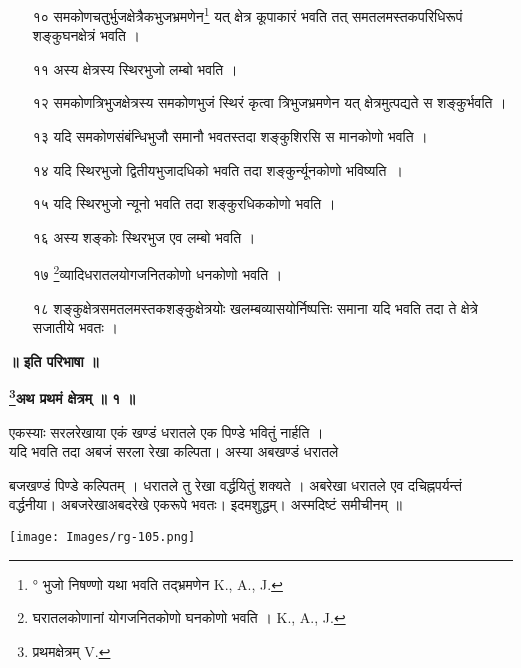 \documentclass[11pt, openany]{book}
\begin{document}
\begin{enumerate}
\item[१०] समकोणचतुर्भुजक्षेत्रैकभुजभ्रमणेन\renewcommand{\thefootnote}{१}\footnote{° भुजो निषण्णो यथा भवति तद्भ्रमणेन {\en K., A., J.}} यत् क्षेत्र कूपाकारं भवति तत् समतलमस्तकपरिधिरूपं शङ्कुघनक्षेत्रं भवति ।

\item[११] अस्य क्षेत्रस्य स्थिरभुजो लम्बो भवति ।

\item[१२] समकोणत्रिभुजक्षेत्रस्य समकोणभुजं स्थिरं कृत्वा त्रिभुजभ्रमणेन
 यत् क्षेत्रमुत्पद्यते स शङ्कुर्भवति ।

\item[१३] यदि समकोणसंबंन्धिभुजौ समानौ भवतस्तदा शङ्कुशिरसि स
 मानकोणो भवति ।

\item[१४] यदि स्थिरभुजो द्वितीयभुजादधिको भवति तदा शङ्कुर्न्यूनकोणो भविष्यति~।

\item[१५] यदि स्थिरभुजो न्यूनो भवति तदा शङ्कुरधिककोणो भवति ।

\item[१६] अस्य शङ्कोः स्थिरभुज एव लम्बो भवति ।

\item[१७] \renewcommand{\thefootnote}{२}\footnote{घरातलकोणानां योगजनितकोणो घनकोणो भवति । {\en K., A., J.}}व्यादिधरातलयोगजनितकोणो धनकोणो भवति ।

\item[१८] शङ्कुक्षेत्रसमतलमस्तकशङ्कुक्षेत्रयोः खलम्बव्यासयोर्निष्पत्तिः समाना
 यदि भवति तदा ते क्षेत्रे सजातीये भवतः ।
\end{enumerate}

\begin{center}
\textbf{ ॥ इति परिभाषा ॥}
\end{center}
\vspace{2mm}

\begin{center}
\textbf{\large  \renewcommand{\thefootnote}{३}\footnote{प्रथमक्षेत्रम् {\en V.}}अथ प्रथमं क्षेत्रम् ॥ १ ॥}
\end{center}
\vspace{2mm}

{\ab एकस्याः सरलरेखाया एकं खण्डं धरातले एक पिण्डे
भवितुं नार्हति ।}\\

 यदि भवति तदा अबजं सरला रेखा कल्पिता। अस्या अबखण्डं
धरातले 
\begin{vwcol}[widths={0.6,0.4}, sep=.8cm, rule=0pt]
बजखण्डं पिण्डे कल्पितम् । धरातले तु रेखा वर्द्धयितुं शक्यते ।
अबरेखा धरातले एव दचिह्नपर्यन्तं वर्द्धनीया। अबजरेखाअबदरेखे
एकरूपे भवतः। इदमशुद्धम्। अस्मदिष्टं समीचीनम् ॥\\
\vspace{-2mm}

\noindent \texttt{[image: Images/rg-105.png]}
\end{vwcol}
\end{document}
